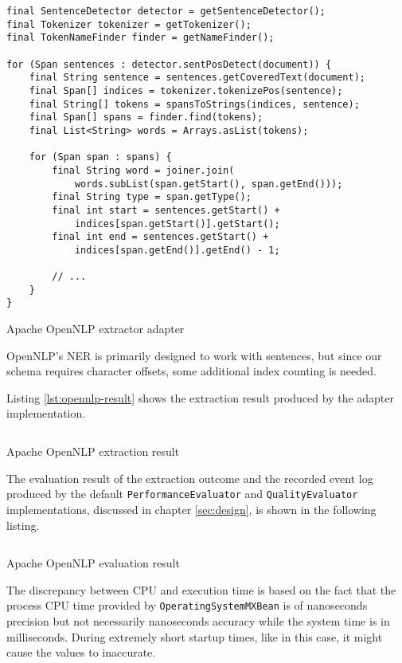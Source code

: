 \begin{listing}[H]
\begin{verbatim}
final SentenceDetector detector = getSentenceDetector();
final Tokenizer tokenizer = getTokenizer();
final TokenNameFinder finder = getNameFinder();

for (Span sentences : detector.sentPosDetect(document)) {
    final String sentence = sentences.getCoveredText(document);
    final Span[] indices = tokenizer.tokenizePos(sentence);
    final String[] tokens = spansToStrings(indices, sentence);
    final Span[] spans = finder.find(tokens);
    final List<String> words = Arrays.asList(tokens);

    for (Span span : spans) {
        final String word = joiner.join(
            words.subList(span.getStart(), span.getEnd()));
        final String type = span.getType();
        final int start = sentences.getStart() + 
            indices[span.getStart()].getStart();
        final int end = sentences.getStart() + 
            indices[span.getEnd()].getEnd() - 1;

        // ...
    }
}
\end{verbatim}
\caption{Apache OpenNLP extractor adapter}
\label{lst:opennlp-adapter}
\end{listing}

OpenNLP's \gls{NER} is primarily designed to work with sentences, but since our schema requires character offsets, some additional index counting is needed.

\newpage
Listing \ref{lst:opennlp-result} shows the extraction result produced by the adapter implementation.

\begin{listing}[H]
\inputminted{xml}{opennlp.xml}
\caption{Apache OpenNLP extraction result}
\label{lst:opennlp-result}
\end{listing}

The evaluation result of the extraction outcome and the recorded event log produced by the default \texttt{PerformanceEvaluator} and \texttt{QualityEvaluator} implementations, discussed in chapter \ref{sec:design}, is shown in the following listing.

\begin{listing}[H]
\inputminted{java}{opennlp.txt}
\caption{Apache OpenNLP evaluation result}
\label{lst:opennlp-eval-result}
\end{listing}

The discrepancy between CPU and execution time is based on the fact that the process CPU time provided by \texttt{OperatingSystemMXBean} is of nanoseconds precision but not necessarily nanoseconds accuracy \cite{OperatingSystemMXBean} while the system time is in milliseconds. During extremely short startup times, like in this case, it might cause the values to inaccurate.

